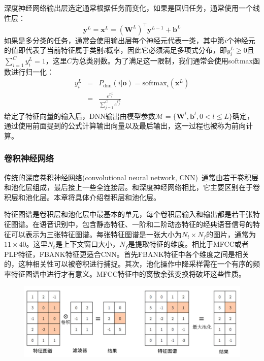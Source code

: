 深度神经网络输出层选定通常根据任务而变化，如果是回归任务，通常使用一个线性层：
\begin{equation}
    \mathbf{y}^L=\mathbf{x}^L=(\mathbf{W}^L)^{\top}\mathbf{y}^{L-1}+\mathbf{b}^L
\end{equation}
如果是多分类的任务，通常会使用输出层每个神经元代表一类，其中第$i$个神经元的值即代表了当前特征属于类别$i$概率，因此它必须满足多项式分布，即$y^L_i \ge 0$且$\sum_{i=1}^C y_i^L=1$，这里$C$为总类别数。为了满足这一限制，我们通常会使用softmax函数进行归一化：
\begin{eqnarray}
    y_i^L&=&P_{\text{dnn}}(i|\mathbf{o})=\text{softmax}_i(\mathbf{x}^L) \\
    &=& \frac{e^{x_i^L}}{\sum_{j=1}^C e^{x_j^L}}
\end{eqnarray}
给定了特征向量的输入后，DNN输出由模型参数$\mathcal{M}=\{ \mathbf{W}^l, \mathbf{b}^l, 0 < l \le L\}$确定，通过使用前面提到的公式计算输出向量以及最后输出，这一过程也被称为前向计算。

\subsubsection{卷积神经网络}
传统的深度卷积神经网络(convolutional neural network, CNN)~\cite{lecun1998gradient}通常由若干卷积层和池化层组成，最后接上一些全连接层。和深度神经网络相比，它主要区别在于卷积层和池化层。本章将具体介绍卷积层和池化层。

特征图谱是卷积层和池化层中最基本的单元，每个卷积层输入和输出都是若干张特征图谱。在语音识别中，包含静态特征、一阶和二阶动态特征的经典语音信号的特征可以表示为三张特征图谱。每张特征图谱是一张大小为$N_t \times N_f$的图片，通常为$11 \times 40$。这里$N_t$是上下文窗口大小，$N_f$是提取特征的维度。相比于MFCC或者PLP特征，FBANK特征更适合CNN。首先FBANK特征中各个维度之间是相关的，这种相关性可以被卷积进行捕捉。其次，池化操作中降采样需在一个有序的频率特征图谱中进行才有意义。MFCC特征中的离散余弦变换将破坏这些性质。

\begin{figure}[!htp]
  \centering
    \captionstyle{\centering}
    \includegraphics[width=.8\textwidth]{figure/cnn.png}
\end{figure}

